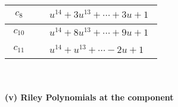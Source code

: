 \documentclass[1p]{elsarticle_modified}
\theoremstyle{definition}
\begin{document}
\begin{tabular}{m{50pt}|m{274pt}}
\hline $$\begin{aligned}c_{8}\end{aligned}$$&$\begin{aligned}
&u^{14}+3 u^{13}+\cdots+3 u+1
\end{aligned}$\\
\hline $$\begin{aligned}c_{10}\end{aligned}$$&$\begin{aligned}
&u^{14}+8 u^{13}+\cdots+9 u+1
\end{aligned}$\\
\hline $$\begin{aligned}c_{11}\end{aligned}$$&$\begin{aligned}
&u^{14}+u^{13}+\cdots-2 u+1
\end{aligned}$\\
\hline
\end{tabular}\\~\\
\newpage\renewcommand{\arraystretch}{1}
\flushleft \textbf{(v) Riley Polynomials at the component}\newline \\
\end{document}
